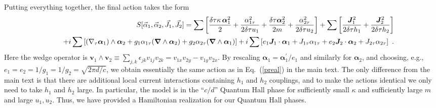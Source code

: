 Putting everything together, the final action takes the form
\begin{eqnarray*}
&& S[{\vec{\alpha}}_1, {\vec{\alpha}}_2, {\vec{J}}_1, {\vec{J}}_2] = 
\sum \left[ \frac{\delta\tau \kappa\, {\bm \alpha}_1^2}{2} + \frac{\alpha_{1\tau}^2}{2\delta\tau u_1} + \frac{\delta\tau {\bm \alpha}_2^2}{2m} + \frac{\alpha_{2\tau}^2}{2\delta\tau u_2} \right]
+ \sum \left[\frac{{\bm {J}}_1^2}{2\delta\tau h_1} + \frac{{\bm {J}}_2^2}{2\delta\tau h_2} \right] \\
&&\quad + i \sum \left[ (\nabla_\tau{\bm \alpha}_1) \wedge {\bm \alpha}_2 + g_1 \alpha_{1\tau} ({\bm \nabla} \wedge {\bm \alpha}_2) + g_2 \alpha_{2\tau} ({\bm \nabla} \wedge {\bm \alpha}_1) \right]
+ i \sum \left[ e_1 {\bm {J}}_1 \cdot {\bm \alpha}_1 + J_{1\tau} \alpha_{1\tau} + e_2 {\bm {J}}_2 \cdot {\bm \alpha}_2 + J_{2\tau} \alpha_{2\tau} \right] ~. 
\end{eqnarray*}
Here the wedge operator is ${\bm v}_1 \wedge {\bm v}_2 \equiv \sum_{j,k} \epsilon_{jk} v_{1j} v_{2k} = v_{1x} v_{2y} - v_{1y} v_{2x}$.
By rescaling ${\bm \alpha}_1 = {\bm \alpha}^\prime_1/e_1$ and similarly for  ${\bm \alpha}_2$, and choosing, e.g., $e_1 = e_2 = 1/g_1 = 1/g_2 = \sqrt{2\pi d/c}$, we obtain essentially the same action as in Eq.~(\ref{preal}) in the main text.  The only difference from the main text is that there are additional local current interactions containing $h_1$ and $h_2$ couplings, and to make the actions identical we only need to take $h_1$ and $h_2$ large.  In particular, the model is in the ``$c/d$'' Quantum Hall phase for sufficiently small $\kappa$ and sufficiently large $m$ and large $u_1, u_2$.
Thus, we have provided a Hamiltonian realization for our Quantum Hall phases.

